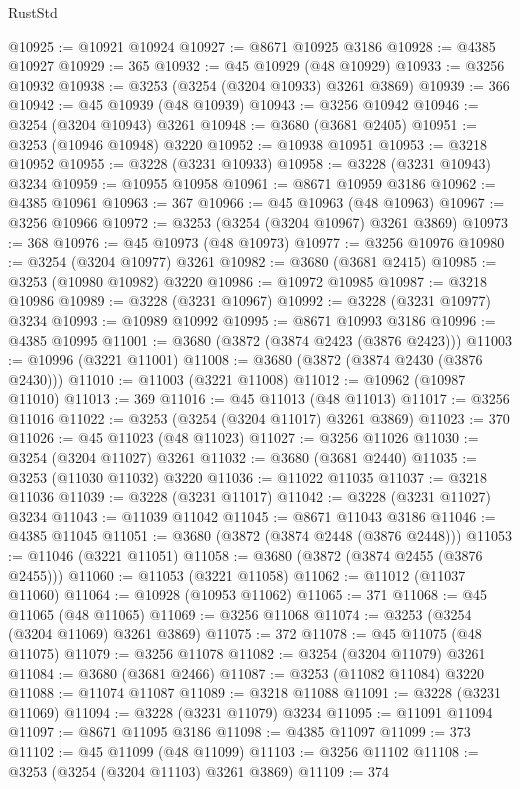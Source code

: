 \begin{lexlean}{RustStd}
\begin{coremodule}
@10925 := @10921 @10924
@10927 := @8671 @10925 @3186
@10928 := @4385 @10927
@10929 := 365
@10932 := @45 @10929 (@48 @10929)
@10933 := @3256 @10932
@10938 := @3253 (@3254 (@3204 @10933) @3261 @3869)
@10939 := 366
@10942 := @45 @10939 (@48 @10939)
@10943 := @3256 @10942
@10946 := @3254 (@3204 @10943) @3261
@10948 := @3680 (@3681 @2405)
@10951 := @3253 (@10946 @10948) @3220
@10952 := @10938 @10951
@10953 := @3218 @10952
@10955 := @3228 (@3231 @10933)
@10958 := @3228 (@3231 @10943) @3234
@10959 := @10955 @10958
@10961 := @8671 @10959 @3186
@10962 := @4385 @10961
@10963 := 367
@10966 := @45 @10963 (@48 @10963)
@10967 := @3256 @10966
@10972 := @3253 (@3254 (@3204 @10967) @3261 @3869)
@10973 := 368
@10976 := @45 @10973 (@48 @10973)
@10977 := @3256 @10976
@10980 := @3254 (@3204 @10977) @3261
@10982 := @3680 (@3681 @2415)
@10985 := @3253 (@10980 @10982) @3220
@10986 := @10972 @10985
@10987 := @3218 @10986
@10989 := @3228 (@3231 @10967)
@10992 := @3228 (@3231 @10977) @3234
@10993 := @10989 @10992
@10995 := @8671 @10993 @3186
@10996 := @4385 @10995
@11001 := @3680 (@3872 (@3874 @2423 (@3876 @2423)))
@11003 := @10996 (@3221 @11001)
@11008 := @3680 (@3872 (@3874 @2430 (@3876 @2430)))
@11010 := @11003 (@3221 @11008)
@11012 := @10962 (@10987 @11010)
@11013 := 369
@11016 := @45 @11013 (@48 @11013)
@11017 := @3256 @11016
@11022 := @3253 (@3254 (@3204 @11017) @3261 @3869)
@11023 := 370
@11026 := @45 @11023 (@48 @11023)
@11027 := @3256 @11026
@11030 := @3254 (@3204 @11027) @3261
@11032 := @3680 (@3681 @2440)
@11035 := @3253 (@11030 @11032) @3220
@11036 := @11022 @11035
@11037 := @3218 @11036
@11039 := @3228 (@3231 @11017)
@11042 := @3228 (@3231 @11027) @3234
@11043 := @11039 @11042
@11045 := @8671 @11043 @3186
@11046 := @4385 @11045
@11051 := @3680 (@3872 (@3874 @2448 (@3876 @2448)))
@11053 := @11046 (@3221 @11051)
@11058 := @3680 (@3872 (@3874 @2455 (@3876 @2455)))
@11060 := @11053 (@3221 @11058)
@11062 := @11012 (@11037 @11060)
@11064 := @10928 (@10953 @11062)
@11065 := 371
@11068 := @45 @11065 (@48 @11065)
@11069 := @3256 @11068
@11074 := @3253 (@3254 (@3204 @11069) @3261 @3869)
@11075 := 372
@11078 := @45 @11075 (@48 @11075)
@11079 := @3256 @11078
@11082 := @3254 (@3204 @11079) @3261
@11084 := @3680 (@3681 @2466)
@11087 := @3253 (@11082 @11084) @3220
@11088 := @11074 @11087
@11089 := @3218 @11088
@11091 := @3228 (@3231 @11069)
@11094 := @3228 (@3231 @11079) @3234
@11095 := @11091 @11094
@11097 := @8671 @11095 @3186
@11098 := @4385 @11097
@11099 := 373
@11102 := @45 @11099 (@48 @11099)
@11103 := @3256 @11102
@11108 := @3253 (@3254 (@3204 @11103) @3261 @3869)
@11109 := 374

\end{coremodule}
\end{lexlean}
